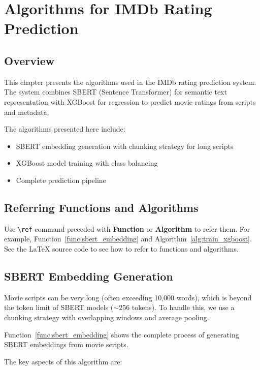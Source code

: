 \chapter{Algorithms for IMDb Rating Prediction}\label{chap:algo}

\section{Overview}

This chapter presents the algorithms used in the IMDb rating prediction system. The system combines SBERT (Sentence Transformer) for semantic text representation with XGBoost for regression to predict movie ratings from scripts and metadata.

The algorithms presented here include:
\begin{itemize}
    \item SBERT embedding generation with chunking strategy for long scripts
    \item XGBoost model training with class balancing
    \item Complete prediction pipeline
\end{itemize}

\section{Referring Functions and Algorithms}

Use \texttt{\textbackslash ref} command preceded with \textbf{Function} or \textbf{Algorithm} to refer them. For example, Function~\ref{func:sbert_embedding} and Algorithm~\ref{alg:train_xgboost}. See the LaTeX source code to see how to refer to functions and algorithms.

\section{SBERT Embedding Generation}

Movie scripts can be very long (often exceeding 10,000 words), which is beyond the token limit of SBERT models ($\sim$256 tokens). To handle this, we use a chunking strategy with overlapping windows and average pooling.

Function~\ref{func:sbert_embedding} shows the complete process of generating SBERT embeddings from movie scripts.



The key aspects of this algorithm are:

